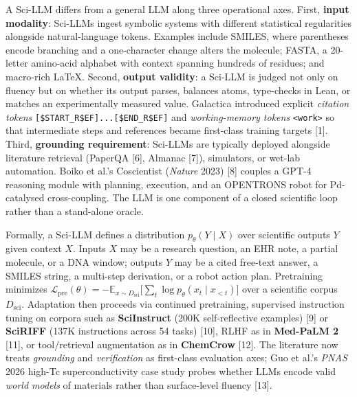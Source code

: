 A Sci-LLM differs from a general LLM along three operational axes. First, \textbf{input modality}: Sci-LLMs ingest symbolic systems with different statistical regularities alongside natural-language tokens. Examples include SMILES, where parentheses encode branching and a one-character change alters the molecule; FASTA, a 20-letter amino-acid alphabet with context spanning hundreds of residues; and macro-rich LaTeX. Second, \textbf{output validity}: a Sci-LLM is judged not only on fluency but on whether its output parses, balances atoms, type-checks in Lean, or matches an experimentally measured value. Galactica introduced explicit \emph{citation tokens} \texttt{{[}\$START\_R\$EF{]}...{[}\$END\_R\$EF{]}} and \emph{working-memory tokens} \texttt{\textless{}work\textgreater{}} so that intermediate steps and references became first-class training targets {[}1{]}. Third, \textbf{grounding requirement}: Sci-LLMs are typically deployed alongside literature retrieval (PaperQA {[}6{]}, Almanac {[}7{]}), simulators, or wet-lab automation. Boiko et al.'s Coscientist (\emph{Nature} 2023) {[}8{]} couples a GPT-4 reasoning module with planning, execution, and an OPENTRONS robot for Pd-catalysed cross-coupling. The LLM is one component of a closed scientific loop rather than a stand-alone oracle.

Formally, a Sci-LLM defines a distribution \(p_\theta(Y \mid X)\) over scientific outputs \(Y\) given context \(X\). Inputs \(X\) may be a research question, an EHR note, a partial molecule, or a DNA window; outputs \(Y\) may be a cited free-text answer, a SMILES string, a multi-step derivation, or a robot action plan. Pretraining minimizes \(\mathcal{L}_{\text{pre}}(\theta) = -\mathbb{E}_{x \sim D_{\text{sci}}}\big[\sum_t \log p_\theta(x_t \mid x_{<t})\big]\) over a scientific corpus \(D_{\text{sci}}\). Adaptation then proceeds via continued pretraining, supervised instruction tuning on corpora such as \textbf{SciInstruct} (200K self-reflective examples) {[}9{]} or \textbf{SciRIFF} (137K instructions across 54 tasks) {[}10{]}, RLHF as in \textbf{Med-PaLM 2} {[}11{]}, or tool/retrieval augmentation as in \textbf{ChemCrow} {[}12{]}. The literature now treats \emph{grounding} and \emph{verification} as first-class evaluation axes; Guo et al.'s \emph{PNAS} 2026 high-Tc superconductivity case study probes whether LLMs encode valid \emph{world models} of materials rather than surface-level fluency {[}13{]}.

